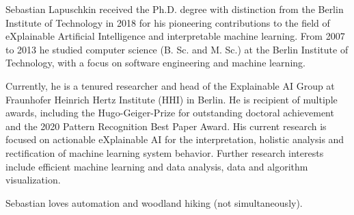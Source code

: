 \documentclass[10pt,a4paper]{article} %
\begin{document}
\spacedhrule{0.9em}{-0.4em} %



\vspace{-1.3em} %

\begin{multicols}{2}  %
\noindent

Sebastian Lapuschkin received the Ph.D. degree with distinction from the Berlin Institute of Technology in 2018 for his pioneering contributions to the field of eXplainable Artificial Intelligence and interpretable machine learning. From 2007 to 2013 he studied computer science (B. Sc. and M. Sc.) at the Berlin Institute of Technology, with a focus on software engineering and machine learning.

Currently, he is a tenured researcher and head of the Explainable AI Group at Fraunhofer Heinrich Hertz Institute (HHI) in Berlin.
He is recipient of multiple awards, including the Hugo-Geiger-Prize for outstanding doctoral achievement and the 2020 Pattern Recognition Best Paper Award.
His current research is focused on actionable eXplainable AI for the interpretation, holistic analysis and rectification of machine learning system behavior.
Further research interests include efficient machine learning and data analysis, data and algorithm visualization.

Sebastian loves automation and woodland hiking (not simultaneously).

\end{multicols}

\spacedhrule{0.5em}{-0.4em} %




\end{document}

